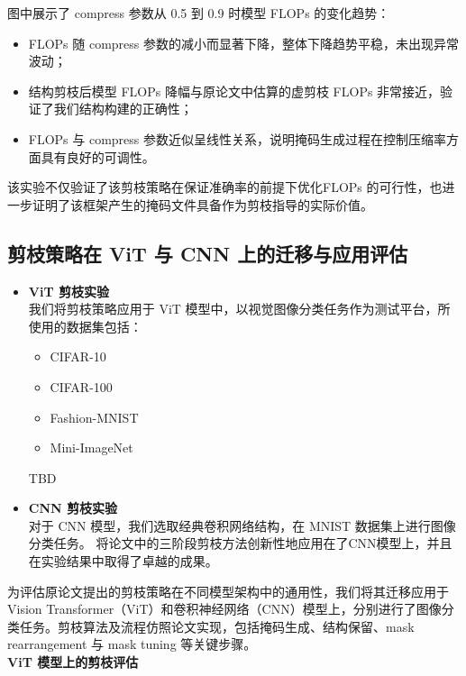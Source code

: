 \documentclass[UTF8,openany]{ctexbook}
\begin{document}
图中展示了 compress 参数从 0.5 到 0.9 时模型 FLOPs 的变化趋势：

\begin{itemize}[itemsep=0pt, topsep=0pt, parsep=0pt, partopsep=0pt]
    \item FLOPs 随 compress 参数的减小而显著下降，整体下降趋势平稳，未出现异常波动；
    \item 结构剪枝后模型 FLOPs 降幅与原论文中估算的虚剪枝 FLOPs 非常接近，验证了我们结构构建的正确性；
    \item FLOPs 与 compress 参数近似呈线性关系，说明掩码生成过程在控制压缩率方面具有良好的可调性。
\end{itemize}

该实验不仅验证了该剪枝策略在保证准确率的前提下优化FLOPs 的可行性，也进一步证明了该框架产生的掩码文件具备作为剪枝指导的实际价值。


\subsection{剪枝策略在 ViT 与 CNN 上的迁移与应用评估}

\begin{itemize}[itemsep=0pt, topsep=0pt, parsep=0pt, partopsep=0pt]
    \item \textbf{ViT 剪枝实验} \\
    我们将剪枝策略应用于 ViT 模型中，以视觉图像分类任务作为测试平台，所使用的数据集包括：
    \begin{itemize}[itemsep=0pt, topsep=0pt, parsep=0pt, partopsep=0pt]
        \item CIFAR-10
        \item CIFAR-100
        \item Fashion-MNIST
        \item Mini-ImageNet
    \end{itemize}
    TBD
    
    \item \textbf{CNN 剪枝实验} \\
    对于 CNN 模型，我们选取经典卷积网络结构，在 MNIST 数据集上进行图像分类任务。
将论文中的三阶段剪枝方法创新性地应用在了CNN模型上，并且在实验结果中取得了卓越的成果。
\end{itemize}

为评估原论文提出的剪枝策略在不同模型架构中的通用性，我们将其迁移应用于 Vision Transformer（ViT）和卷积神经网络（CNN）模型上，分别进行了图像分类任务。剪枝算法及流程仿照论文实现，包括掩码生成、结构保留、mask rearrangement 与 mask tuning 等关键步骤。\\
\noindent\textbf{ViT 模型上的剪枝评估} 
\end{document}
